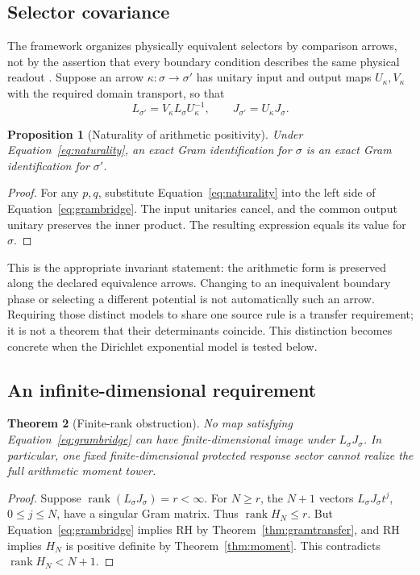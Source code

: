 \documentclass[11pt,letterpaper]{article}
\numberwithin{equation}{section}
\newtheorem{theorem}{Theorem}[section]
\newtheorem{proposition}[theorem]{Proposition}
\theoremstyle{definition}
\theoremstyle{remark}
\DeclareMathOperator{\rank}{rank}
\begin{document}
\subsection{Selector covariance}
The framework organizes physically equivalent selectors by comparison arrows, not by the assertion that every boundary condition describes the same physical readout \cite{tcgsfoundation,tcgsoperator}. Suppose an arrow $\kappa:\sigma\to\sigma'$ has unitary input and output maps $U_\kappa,V_\kappa$ with the required domain transport, so that
\begin{equation}
 L_{\sigma'}=V_\kappa L_\sigma U_\kappa^{-1},\qquad
 J_{\sigma'}=U_\kappa J_\sigma.
 \label{eq:naturality}
\end{equation}

\begin{proposition}[Naturality of arithmetic positivity]
\label{prop:natural}
Under Equation~\eqref{eq:naturality}, an exact Gram identification for $\sigma$ is an exact Gram identification for $\sigma'$.
\end{proposition}
\begin{proof}
For any $p,q$, substitute Equation~\eqref{eq:naturality} into the left side of Equation~\eqref{eq:grambridge}. The input unitaries cancel, and the common output unitary preserves the inner product. The resulting expression equals its value for $\sigma$.
\end{proof}

This is the appropriate invariant statement: the arithmetic form is preserved along the declared equivalence arrows. Changing to an inequivalent boundary phase or selecting a different potential is not automatically such an arrow. Requiring those distinct models to share one source rule is a transfer requirement; it is not a theorem that their determinants coincide. This distinction becomes concrete when the Dirichlet exponential model is tested below.

\subsection{An infinite-dimensional requirement}
\begin{theorem}[Finite-rank obstruction]
\label{thm:rank}
No map satisfying Equation~\eqref{eq:grambridge} can have finite-dimensional image under $L_\sigma J_\sigma$. In particular, one fixed finite-dimensional protected response sector cannot realize the full arithmetic moment tower.
\end{theorem}
\begin{proof}
Suppose $\rank(L_\sigma J_\sigma)=r<\infty$. For $N\geq r$, the $N+1$ vectors $L_\sigma J_\sigma t^j$, $0\leq j\leq N$, have a singular Gram matrix. Thus $\rank H_N\leq r$. But Equation~\eqref{eq:grambridge} implies RH by Theorem~\ref{thm:gramtransfer}, and RH implies $H_N$ is positive definite by Theorem~\ref{thm:moment}. This contradicts $\rank H_N<N+1$.
\end{proof}
\end{document}
